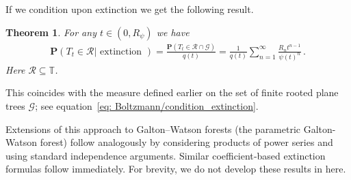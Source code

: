 \documentclass[11pt,a4paper,leqno]{amsart}
\theoremstyle{plain}
\newtheorem{theo}{Theorem}[section]
\theoremstyle{definition}
\numberwithin{equation}{section}
\def\P{\mathbf{P}}
\begin{document}
	If we condition upon extinction we get the following result. 
	\begin{theo} For any $t \in (0,R_{\psi})$ we have
		\begin{align*}
			\P(T_t \in \mathcal{R} | \text{ extinction }) = \frac{\P(T_t \in \mathcal{R} \cap \mathcal{G})}{q(t)} = \frac{1}{q(t)}\sum_{n = 1}^{\infty}\frac{R_n t^{n-1}}{\psi(t)^n}\,.
		\end{align*}
		Here $\mathcal{R} \subseteq \mathbb{T}$.
	\end{theo}
	This coincides with the measure defined earlier on the set of finite rooted plane trees \(\mathcal{G}\); see equation~\eqref{eq: Boltzmann/condition_extinction}.
	\smallskip
	
	Extensions of this approach to Galton–Watson forests (the parametric Galton-Watson forest) follow analogously by considering products of power series and using standard independence arguments. Similar coefficient‑based extinction formulas follow immediately. For brevity, we do not develop these results in here.
	
	
	
\end{document}
